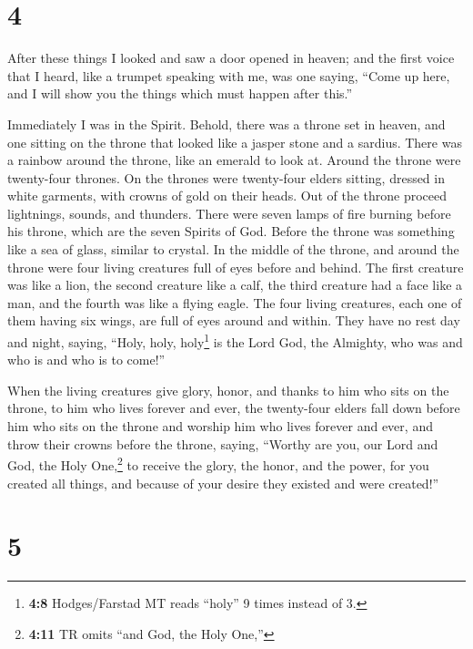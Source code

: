\hypertarget{section-3}{%
\section{4}\label{section-3}}

 After these things I looked and saw a door opened in
heaven; and the first voice that I heard, like a trumpet speaking with
me, was one saying, ``Come up here, and I will show you the things which
must happen after this.''

 Immediately I was in the Spirit. Behold, there was a
throne set in heaven, and one sitting on the throne  that
looked like a jasper stone and a sardius. There was a rainbow around the
throne, like an emerald to look at.  Around the throne
were twenty-four thrones. On the thrones were twenty-four elders
sitting, dressed in white garments, with crowns of gold on their heads.
 Out of the throne proceed lightnings, sounds, and
thunders. There were seven lamps of fire burning before his throne,
which are the seven Spirits of God.  Before the throne was
something like a sea of glass, similar to crystal. In the middle of the
throne, and around the throne were four living creatures full of eyes
before and behind.  The first creature was like a lion,
the second creature like a calf, the third creature had a face like a
man, and the fourth was like a flying eagle.  The four
living creatures, each one of them having six wings, are full of eyes
around and within. They have no rest day and night, saying, ``Holy,
holy, holy\footnote{\textbf{4:8} Hodges/Farstad MT reads ``holy'' 9
  times instead of 3.} is the Lord God, the Almighty, who was and who is
and who is to come!''

 When the living creatures give glory, honor, and thanks
to him who sits on the throne, to him who lives forever and ever,
 the twenty-four elders fall down before him who sits on
the throne and worship him who lives forever and ever, and throw their
crowns before the throne, saying,  ``Worthy are you, our
Lord and God, the Holy One,\footnote{\textbf{4:11} TR omits ``and God,
  the Holy One,''} to receive the glory, the honor, and the power, for
you created all things, and because of your desire they existed and were
created!''

\hypertarget{section-4}{%
\section{5}\label{section-4}}

